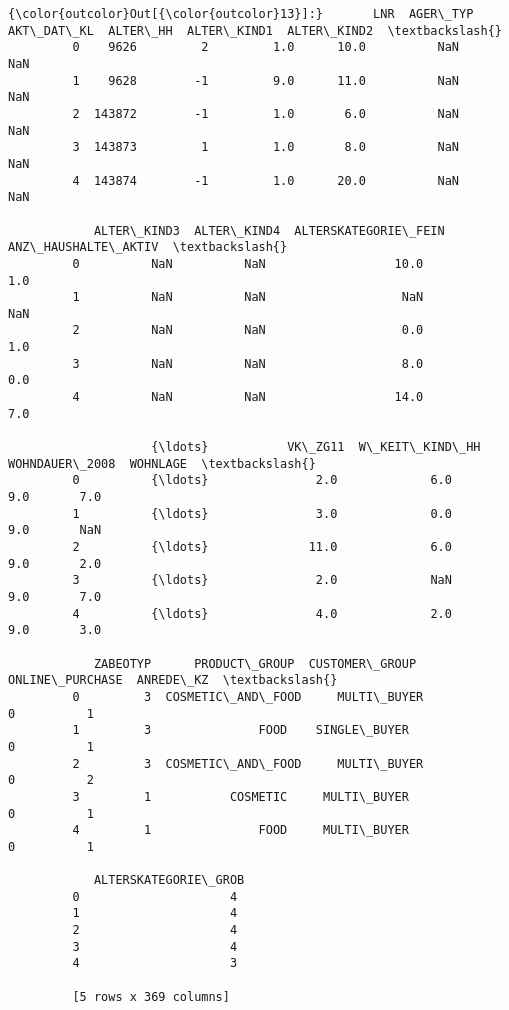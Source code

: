 \documentclass[11pt]{article}
\begin{document}
\begin{Verbatim}[commandchars=\\\{\}]
{\color{outcolor}Out[{\color{outcolor}13}]:}       LNR  AGER\_TYP  AKT\_DAT\_KL  ALTER\_HH  ALTER\_KIND1  ALTER\_KIND2  \textbackslash{}
         0    9626         2         1.0      10.0          NaN          NaN   
         1    9628        -1         9.0      11.0          NaN          NaN   
         2  143872        -1         1.0       6.0          NaN          NaN   
         3  143873         1         1.0       8.0          NaN          NaN   
         4  143874        -1         1.0      20.0          NaN          NaN   
         
            ALTER\_KIND3  ALTER\_KIND4  ALTERSKATEGORIE\_FEIN  ANZ\_HAUSHALTE\_AKTIV  \textbackslash{}
         0          NaN          NaN                  10.0                  1.0   
         1          NaN          NaN                   NaN                  NaN   
         2          NaN          NaN                   0.0                  1.0   
         3          NaN          NaN                   8.0                  0.0   
         4          NaN          NaN                  14.0                  7.0   
         
                    {\ldots}           VK\_ZG11  W\_KEIT\_KIND\_HH  WOHNDAUER\_2008  WOHNLAGE  \textbackslash{}
         0          {\ldots}               2.0             6.0             9.0       7.0   
         1          {\ldots}               3.0             0.0             9.0       NaN   
         2          {\ldots}              11.0             6.0             9.0       2.0   
         3          {\ldots}               2.0             NaN             9.0       7.0   
         4          {\ldots}               4.0             2.0             9.0       3.0   
         
            ZABEOTYP      PRODUCT\_GROUP  CUSTOMER\_GROUP ONLINE\_PURCHASE  ANREDE\_KZ  \textbackslash{}
         0         3  COSMETIC\_AND\_FOOD     MULTI\_BUYER               0          1   
         1         3               FOOD    SINGLE\_BUYER               0          1   
         2         3  COSMETIC\_AND\_FOOD     MULTI\_BUYER               0          2   
         3         1           COSMETIC     MULTI\_BUYER               0          1   
         4         1               FOOD     MULTI\_BUYER               0          1   
         
            ALTERSKATEGORIE\_GROB  
         0                     4  
         1                     4  
         2                     4  
         3                     4  
         4                     3  
         
         [5 rows x 369 columns]
\end{Verbatim}
            
\end{document}
